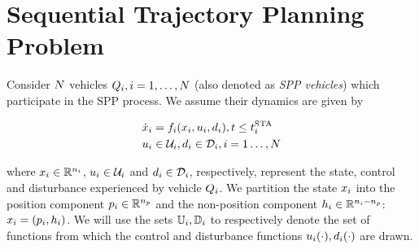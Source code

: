 \section{Sequential Trajectory Planning Problem \label{sec:formulation}}
Consider $N$ vehicles $Q_i, i = 1, \ldots, N$ (also denoted as \textit{SPP vehicles}) which participate in the SPP process. We assume their dynamics are given by 

\begin{equation}
\label{eq:dyn}
\begin{aligned}
\dot\state_i &= \fdyn_i(\state_i, \ctrl_i, \dstb_i), t \le \sta_i \\
\ctrl_i &\in \cset_i, \dstb_i \in \dset_i, i = 1 \ldots, \N
\end{aligned}
\end{equation}

\noindent where $x_i \in \mathbb{R}^{n_i}$, $u_i \in \mathcal{U}_i$ and $d_i \in \mathcal{D}_i$, respectively, represent the state, control and disturbance experienced by vehicle $Q_i$. We partition the state $x_i$ into the position component $p_i \in \mathbb{R}^{n_p}$ and the non-position component $h_i \in \mathbb{R}^{n_i - n_p}$: $x_i = (p_i, h_i)$. %
We will use the sets $\mathbb{U}_i, \mathbb{D}_i$ to respectively denote the set of functions from which the control and disturbance functions $u_i(\cdot), d_i(\cdot)$ are drawn.


